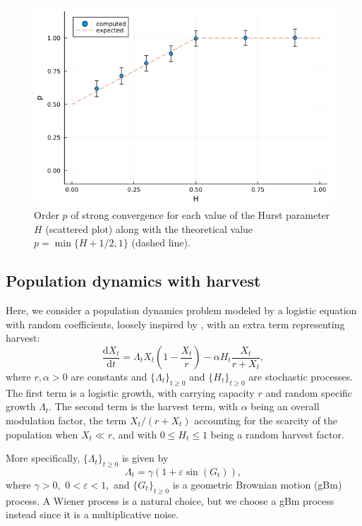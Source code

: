 \documentclass[reqno,12pt]{amsart}
\theoremstyle{plain} %
\theoremstyle{definition} %
\begin{document}
\begin{figure}[htb]
    \includegraphics[scale=0.6]{img/order_dep_on_H_fBm.png}
    \caption{Order $p$ of strong convergence for each value of the Hurst parameter $H$ (scattered plot) along with the theoretical value $p=\min\{H + 1/2, 1\}$ (dashed line).}
    \label{figorderdepHfBm}
\end{figure}

\subsection{Population dynamics with harvest}
\label{secpopdyn}

Here, we consider a population dynamics problem modeled by a logistic equation with random coefficients, loosely inspired by \cite[Section 15.2]{HanKloeden2017}, with an extra term representing harvest:
\begin{equation}
    \label{rodepopulationdynamics}
    \frac{\mathrm{d}X_t}{\mathrm{d}t} = \Lambda_t X_t (1 - \frac{X_t}{r}) - \alpha H_t \frac{X_t}{r + X_t},
\end{equation}
where $r, \alpha > 0$ are constants and $\{\Lambda_t\}_{t \geq 0}$ and $\{H_t\}_{t \geq 0}$ are stochastic processes. The first term is a logistic growth, with carrying capacity $r$ and random specific growth $\Lambda_t$. The second term is the harvest term, with $\alpha$ being an overall modulation factor, the term $X_t / (r + X_t)$ accounting for the scarcity of the population when $X_t \ll r$, and with $0 \leq H_t \leq 1$ being a random harvest factor. 

More specifically, $\{\Lambda_t\}_{t \geq 0}$ is given by
\[
    \Lambda_t = \gamma (1 + \varepsilon \sin(G_t)),
\]
where $\gamma > 0,$ $0 < \varepsilon < 1,$ and $\{G_t\}_{t\geq 0}$ is a geometric Brownian motion (gBm) process. A Wiener process is a natural choice, but we choose a gBm process instead since it is a multiplicative noise.
\end{document}
